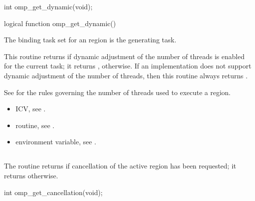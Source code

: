 \format
\ccppspecificstart
\begin{boxedcode}
int omp\_get\_dynamic(void);
\end{boxedcode}
\ccppspecificend

\fortranspecificstart
\begin{boxedcode}
logical function omp\_get\_dynamic()
\end{boxedcode}
\fortranspecificend

\binding
The binding task set for an  region is the generating task. 

\effect
This routine returns  if dynamic adjustment of the number of threads is enabled for 
the current task; it returns , otherwise. If an implementation does not support 
dynamic adjustment of the number of threads, then this routine always returns .

See  
for the rules governing the number of threads used to 
execute a  region. 

\crossreferences
\begin{itemize}
\item {} ICV, see 
.

\item {} routine, see 
.

\item {} environment variable, see 
.
\end{itemize}









\subsection{}
\label{subsec:omp_get_cancellation}
\summary
The  routine returns  if cancellation of the active region has been requested; it returns  otherwise.

\format
\ccppspecificstart
\begin{boxedcode}
int omp\_get\_cancellation(void);
\end{boxedcode}
\ccppspecificend

